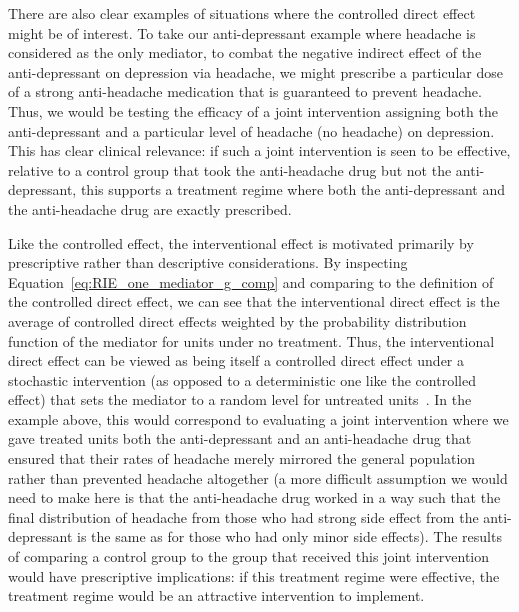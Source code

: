 There are also clear examples of situations where the controlled direct effect might be of interest. To take our
anti-depressant example where headache is considered as the only mediator, to combat the negative indirect
effect of the anti-depressant on depression via headache, we might prescribe a particular dose of a 
strong anti-headache medication that is guaranteed to prevent headache. Thus, we would be testing the efficacy
of a joint intervention assigning both the anti-depressant and a particular level of headache (no headache)
on depression. This has clear clinical relevance: if such a joint intervention is seen to be effective, 
relative to a control group that took the anti-headache drug but not the anti-depressant,
this supports a treatment regime where both the anti-depressant and the anti-headache drug are exactly 
prescribed. 

Like the controlled effect, the interventional effect is motivated primarily by prescriptive rather than
descriptive considerations. By inspecting Equation~\ref{eq:RIE_one_mediator_g_comp} and comparing to the 
definition of the controlled direct effect, we can see that the interventional direct effect is the
average of controlled direct effects weighted by the probability distribution function of the mediator 
for units under no treatment. Thus, the interventional direct effect can be viewed as being itself a 
controlled direct effect under a stochastic intervention (as opposed to a deterministic one like the
controlled effect) that sets the mediator to a random level for untreated units~\cite{vanderweeleetal2014}.
In the example above, this would correspond to evaluating a joint intervention where we gave 
treated units both the anti-depressant and 
an anti-headache drug that ensured that their rates of headache merely mirrored the 
general population rather than prevented headache altogether (a more difficult assumption we would 
need to make here is that the anti-headache drug worked in a way such
that the final distribution of headache from those who had strong side effect from the anti-depressant is the 
same as for those who had only minor side effects). The results of comparing a control group to the 
group that received this joint intervention would have prescriptive implications: if this treatment regime 
were effective, the treatment regime would be an attractive intervention to implement. 

